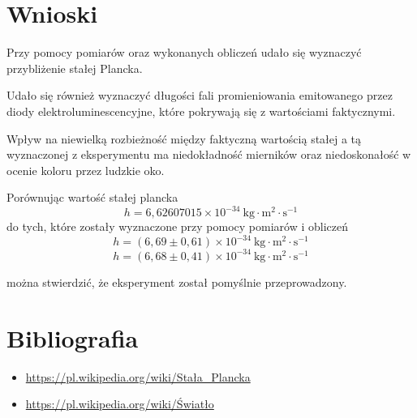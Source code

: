 \documentclass[12pt]{article}
\begin{document}
\section{Wnioski}

Przy pomocy pomiarów oraz wykonanych obliczeń udało się wyznaczyć przybliżenie stałej Plancka.

Udało się również wyznaczyć długości fali promieniowania emitowanego przez diody elektroluminescencyjne,
które pokrywają się z wartościami faktycznymi.

Wpływ na niewielką rozbieżność między faktyczną wartością stałej a tą wyznaczonej z eksperymentu 
ma niedokładność mierników oraz niedoskonałość w ocenie koloru przez ludzkie oko. \bigskip

Porównując wartość stałej plancka 
\[ h = 6,62607015 \times 10^{-34} \ \textrm{kg} \cdot \textrm{m}^2 \cdot \textrm{s}^{-1} \]
do tych, które zostały wyznaczone przy pomocy pomiarów i obliczeń
\[ h = (6,69 \pm 0,61) \times 10^{-34} \ \textrm{kg} \cdot \textrm{m}^2 \cdot \textrm{s}^{-1} \] 
\[ h = (6,68 \pm 0,41) \times 10^{-34} \ \textrm{kg} \cdot \textrm{m}^2 \cdot \textrm{s}^{-1} \] 

można stwierdzić, że eksperyment został pomyślnie przeprowadzony.

\section{Bibliografia}

\begin{itemize}
    \item \url{https://pl.wikipedia.org/wiki/Stała_Plancka}
    \item \url{https://pl.wikipedia.org/wiki/Światło}
\end{itemize}
\end{document}
